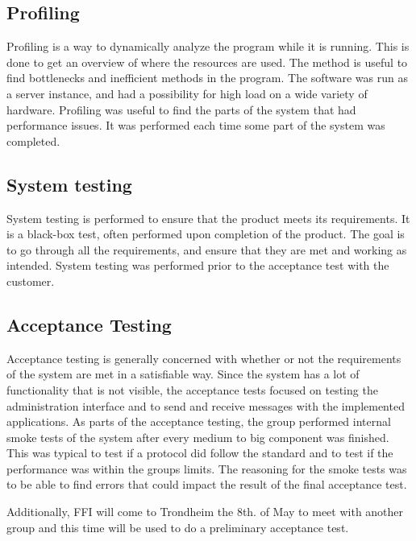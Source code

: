\subsection{Profiling}
\label{subsec:testing-test_description-profiling}

Profiling is a way to dynamically analyze the program while it is running. This is done to get an overview of where the resources are used. The method is useful to find bottlenecks and inefficient methods in the program. The software was run as a server instance, and had a possibility for high load on a wide variety of hardware. Profiling was useful to find the parts of the system that had performance issues. It was performed each time some part of the system was completed.

\subsection{System testing}
\label{subsec:testing-test_description-system_testing}

System testing is performed to ensure that the product meets its requirements. It is a black-box test, often performed upon completion of the product. The goal is to go through all the requirements, and ensure that they are met and working as intended. System testing was performed prior to the acceptance test with the customer.

\subsection{Acceptance Testing}
\label{subsec:testing-test_description-acceptance_testing}
Acceptance testing is generally concerned with whether or not the requirements of the system are met in a satisfiable way. Since the system has a lot of functionality that is not visible, the acceptance tests focused on testing the administration interface and to send and receive messages with the implemented applications.
As parts of the acceptance testing, the group performed internal smoke tests of the system after every medium to big component was finished. This was typical to test if a protocol did follow the standard and to test if the performance was within the groups limits. The reasoning for the smoke tests was to be able to find errors that could impact the result of the final acceptance test.

Additionally, FFI will come to Trondheim the 8th. of May to meet with another group and this time will be used to do a preliminary acceptance test.

